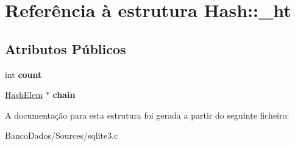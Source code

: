 \hypertarget{struct_hash_1_1__ht}{\section{Referência à estrutura Hash\-:\-:\-\_\-ht}
\label{struct_hash_1_1__ht}
}
\subsection*{Atributos Públicos}
\begin{DoxyCompactItemize}
\item 
\hypertarget{struct_hash_1_1__ht_a0677191178b6c7c5c6c2880f41cf24b1}{int {\bfseries count}}\label{struct_hash_1_1__ht_a0677191178b6c7c5c6c2880f41cf24b1}

\item 
\hypertarget{struct_hash_1_1__ht_a56fc145e7d38d9440d85ab2ea63a48ac}{\hyperlink{struct_hash_elem}{Hash\-Elem} $\ast$ {\bfseries chain}}\label{struct_hash_1_1__ht_a56fc145e7d38d9440d85ab2ea63a48ac}

\end{DoxyCompactItemize}


A documentação para esta estrutura foi gerada a partir do seguinte ficheiro\-:\begin{DoxyCompactItemize}
\item 
Banco\-Dados/\-Sources/sqlite3.\-c\end{DoxyCompactItemize}
